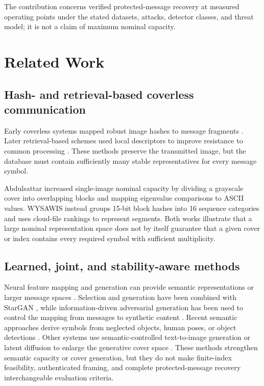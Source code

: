 ﻿\documentclass[a4paper,fleqn]{cas-dc}
\begin{document}
The contribution concerns verified protected-message recovery at measured
operating points under the stated datasets, attacks, detector classes, and
threat model; it is not a claim of maximum nominal capacity.

\section{Related Work}
\label{sec:related}

\subsection{Hash- and retrieval-based coverless communication}

Early coverless systems mapped robust image hashes to message fragments
\cite{zhou2015coverless,zheng2017hashing}. Later retrieval-based schemes used
local descriptors to improve resistance to common processing
\cite{li2024surf}. These methods preserve the transmitted image, but the
database must contain sufficiently many stable representatives for every
message symbol.

Abdulsattar \cite{abdulsattar2021} increased single-image nominal capacity by
dividing a grayscale cover into overlapping blocks and mapping eigenvalue
comparisons to ASCII values. WYSAWIS \cite{wysawis2025} instead groups
15-bit block hashes into 16 sequence categories and uses cloud-file rankings
to represent segments. Both works illustrate that a large nominal
representation space does not by itself guarantee that a given cover or index
contains every required symbol with sufficient multiplicity.

\subsection{Learned, joint, and stability-aware methods}

Neural feature mapping and generation can provide semantic representations or
larger message spaces \cite{qin2020gan,meng2024review}. Selection and
generation have been combined with StarGAN \cite{chen2022stargan}, while
information-driven adversarial generation has been used to control the
mapping from messages to synthetic content \cite{zhang2023idgan}. Recent
semantic approaches derive symbols from neglected objects, human poses, or
object detections \cite{zou2023neglected,tan2024pose,meng2024object}. Other
systems use semantic-controlled text-to-image generation or latent diffusion
to enlarge the generative cover space
\cite{li2025semantic,guo2026diffusion}. These methods strengthen semantic
capacity or cover generation, but they do not make finite-index feasibility,
authenticated framing, and complete protected-message recovery interchangeable
evaluation criteria.
\end{document}
